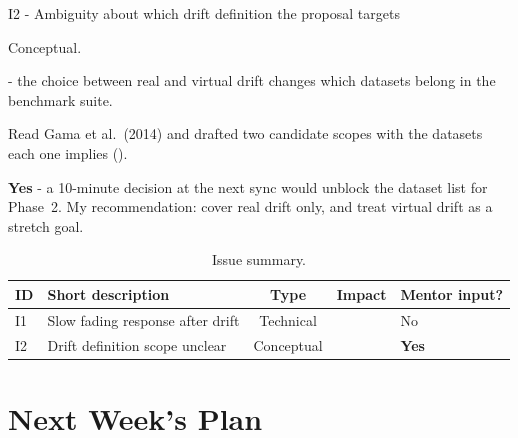 \begin{issuebox}{I2 - Ambiguity about which drift definition the proposal targets}
\begin{description}[font=\bfseries,style=sameline,leftmargin=0pt,labelindent=0pt,itemindent=0pt,labelwidth=0pt,labelsep=0.4em,itemsep=2pt,topsep=2pt]
  \item[Type:] Conceptual.
  \item[Impact:]  - the choice between real and virtual
        drift changes which datasets belong in the benchmark suite.
  \item[Handling:] Read Gama et al.\ (2014) and drafted two candidate scopes
        with the datasets each one implies ().
  \item[Mentor support:] \textbf{Yes} - a 10-minute decision at the next sync
        would unblock the dataset list for Phase~2. My recommendation:
        cover real drift only, and treat virtual drift as a stretch goal.
\end{description}
\end{issuebox}

\begin{table}[H]
\centering
\caption{Issue summary.}
\label{tab:issues}
\small
\begin{tabularx}{\textwidth}{@{}l L c c l@{}}
\toprule
\textbf{ID} & \textbf{Short description} & \textbf{Type} & \textbf{Impact} & \textbf{Mentor input?} \\
\midrule
I1 & Slow fading response after drift & Technical  &  & No \\
I2 & Drift definition scope unclear   & Conceptual &     & \textbf{Yes} \\
\bottomrule
\end{tabularx}
\end{table}

\section{Next Week's Plan}

